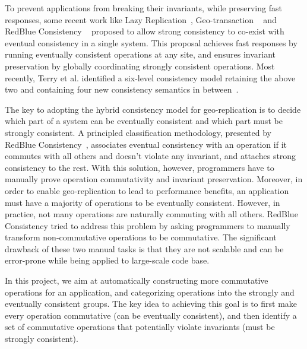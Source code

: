 To prevent applications from breaking their invariants, while preserving fast responses,
some recent work like Lazy Replication~\cite{Ladin1992LazyRep}, Geo-transaction ~\cite{Sovran2011TranGeo} and RedBlue
Consistency ~\cite{Li2012RedBlue} proposed to allow strong consistency to co-exist
with eventual consistency in a single system. This proposal achieves fast responses 
by running eventually consistent operations at any site, and ensures invariant preservation
by globally coordinating strongly consistent operations. Most recently, Terry
 et al. identified a six-level consistency model retaining the above two
and containing four new consistency semantics in between~\cite{Terry2013CBSLA}.

The key to adopting the hybrid consistency model for geo-replication is to
decide which part of a system can be eventually consistent and 
which part must be strongly consistent. A principled classification methodology,
presented by RedBlue Consistency~\cite{Li2012RedBlue}, associates 
eventual consistency with an operation if it commutes with all others 
and doesn't violate any invariant, and attaches strong consistency to the rest. 
With this solution, however, programmers have to manually prove operation commutativity and
invariant preservation. Moreover, in order to enable geo-replication to lead
to performance benefits, an application must have a majority of operations 
to be eventually consistent. However, in practice, not many operations are naturally
commuting with all others. RedBlue Consistency tried to address this problem by 
asking programmers to manually transform non-commutative
operations to be commutative. The significant drawback of these two
manual tasks is that they are not scalable and can be error-prone while
being applied to large-scale code base.

In this project, we aim at automatically constructing more commutative
operations for an application, and categorizing operations into
the strongly and eventually consistent groups. The key idea to achieving this goal
is to first make every operation commutative (can be eventually consistent), 
and then identify a set of commutative operations that potentially violate invariants
(must be strongly consistent).

